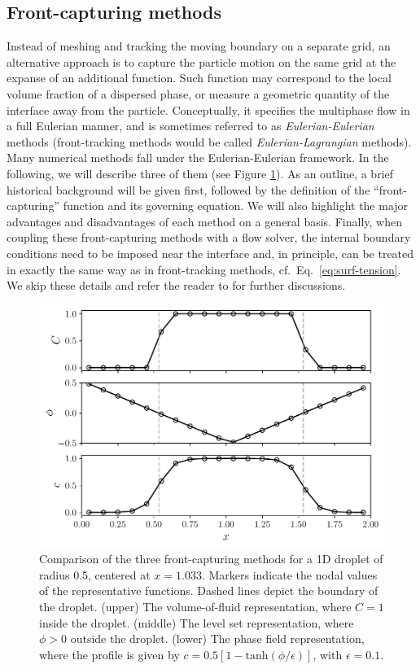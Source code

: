 \subsection{Front-capturing methods}

Instead of meshing and tracking the moving boundary on a separate grid, an alternative approach is to capture the particle motion on the same grid at the expanse of an additional function. Such function may correspond to the local volume fraction of a dispersed phase, or measure a geometric quantity of the interface away from the particle.
Conceptually, it specifies the multiphase flow in a full Eulerian manner, and is sometimes referred to as \emph{Eulerian-Eulerian} methods (front-tracking methods would be called \emph{Eulerian-Lagrangian} methods).
Many numerical methods fall under the Eulerian-Eulerian framework. In the following, we will describe three of them (see Figure \ref{fig:front-capture}).
As an outline, a brief historical background will be given first, followed by the definition of the ``front-capturing'' function and its governing equation. We will also highlight the major advantages and disadvantages of each method on a general basis.
Finally, when coupling these front-capturing methods with a flow solver, the internal boundary conditions need to be imposed near the interface and, in principle, can be treated in exactly the same way as in front-tracking methods, cf.\ Eq.\ \eqref{eq:surf-tension}. We skip these details and refer the reader to \cite{Brackbill_JCP_1992, Fedkiw_JCP_1999, Lalanne_JCP_2015, Popinet_ARFM_2018, Gibou_Fedkiv_Osher, ICLS} for further discussions.

\begin{figure}%
  \centering
  \includegraphics[width=\columnwidth]{front-capture-comp.pdf}
  \caption{Comparison of the three front-capturing methods for a 1D droplet of radius 0.5, centered at $x=1.033$. Markers indicate the nodal values of the representative functions. Dashed lines depict the boundary of the droplet.
  (upper) The volume-of-fluid representation, where $C=1$ inside the droplet.
  (middle) The level set representation, where $\phi >0$ outside the droplet.
  (lower) The phase field representation, where the profile is given by $c=0.5[1-\mathrm{tanh}(\phi/\epsilon)]$, with $\epsilon=0.1$.}
  \label{fig:front-capture}
\end{figure}


